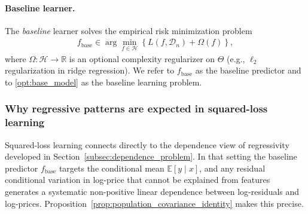 \documentclass{article}
\theoremstyle{plain}
\theoremstyle{definition}
\newcommand{\E}{\mathbb{E}}
\newcommand{\1}{\mathbf{1}}
\newcommand{\D}{\mathcal{D}}
\renewcommand{\H}{\mathcal{H}}
\begin{document}
\paragraph{Baseline learner.} The \emph{baseline} learner solves the empirical risk minimization problem
\begin{align}
\label{opt:base_model}
f_{\mathrm{base}}
\in
\arg\min_{f \in \H}
\left\{
L(f, \D_n)+\Omega(f)
\right\},
\end{align}
where $\Omega:\H\to\mathbb R$ is an optional complexity regularizer on $\Theta$ (e.g., $\ell_2$ regularization in ridge regression). We refer to $f_{\mathrm{base}}$ as the baseline predictor and to \eqref{opt:base_model} as the baseline learning problem.



\subsubsection{Why regressive patterns are expected in squared-loss learning}
\label{subsec:squared_loss_regressivity}

Squared-loss learning connects directly to the dependence view of regressivity developed in Section~\ref{subsec:dependence_problem}. In that setting the baseline predictor $f_{\mathrm{base}}$ targets the conditional mean $\E[y\mid x]$, and any residual conditional variation in log-price that cannot be explained from features generates a systematic non-positive linear dependence between log-residuals and log-prices. Proposition~\ref{prop:population_covariance_identity} makes this precise.



\end{document}
